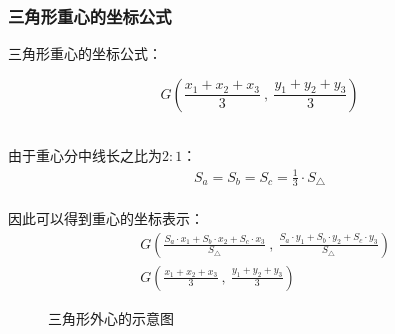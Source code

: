 \documentclass[UTF8]{ctexart}
\begin{document}
\newpage

\subsubsection{三角形重心的坐标公式}
    三角形重心的坐标公式：
    \begin{large}
        \begin{equation*}
            G\left(\frac{x_1+x_2+x_3}{3}~,~\frac{y_1+y_2+y_3}{3}\right)
        \end{equation*}
    \end{large}\\
    由于重心分中线长之比为$2:1$：
    \setcounter{equation}{0}
    \begin{align}
        S_a=S_b=S_c=\frac{1}{3}\cdot S_{\triangle}
    \end{align}\\
    因此可以得到重心的坐标表示：\vspace{5pt}
    \begin{align}
        &G\left(\frac{S_a\cdot x_1+S_b\cdot x_2+S_c\cdot x_3}{S_\triangle}~,~\frac{S_a\cdot y_1+S_b\cdot y_2+S_c\cdot y_3}{S_\triangle}\right)\\[3mm]
        &G\left(\frac{x_1+x_2+x_3}{3}~,~\frac{y_1+y_2+y_3}{3}\right)
    \end{align}
    \begin{figure}[htbp]
        \begin{center}
            \caption{三角形外心的示意图}
        \end{center}
    \end{figure}
\end{document}
